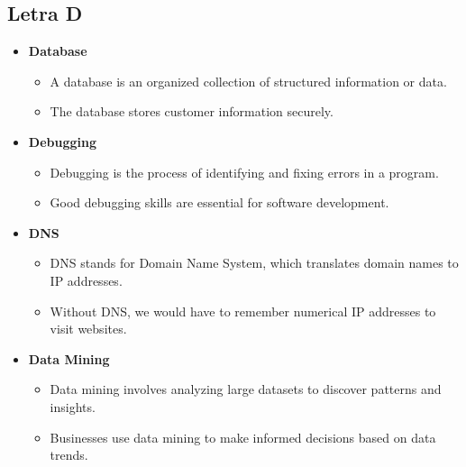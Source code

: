     \subsection{Letra D}
    \begin{itemize}
        \item \textbf{Database}
        \begin{itemize}
            \item A database is an organized collection of structured information or data.
            \item The database stores customer information securely.
        \end{itemize}
        \item \textbf{Debugging}
        \begin{itemize}
            \item Debugging is the process of identifying and fixing errors in a program.
            \item Good debugging skills are essential for software development.
        \end{itemize}
        \item \textbf{DNS}
        \begin{itemize}
            \item DNS stands for Domain Name System, which translates domain names to IP addresses.
            \item Without DNS, we would have to remember numerical IP addresses to visit websites.
        \end{itemize}
        \item \textbf{Data Mining}
        \begin{itemize}
            \item Data mining involves analyzing large datasets to discover patterns and insights.
            \item Businesses use data mining to make informed decisions based on data trends.
        \end{itemize}
    \end{itemize}

